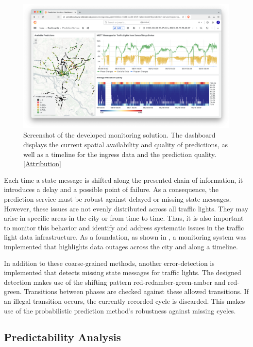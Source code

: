 \begin{figure}[t]
\centering
\includegraphics[width=\linewidth]{images/monitoring-screenshot.png}
\caption{Screenshot of the developed monitoring solution. The dashboard displays the current spatial availability and quality of predictions, as well as a timeline for the ingress data and the prediction quality. [\hyperref[attribution]{Attribution}]}
\label{fig:monitoring-screenshot}
\end{figure}

Each time a state message is shifted along the presented chain of information, it introduces a delay and a possible point of failure. As a consequence, the prediction service must be robust against delayed or missing state messages. However, these issues are not evenly distributed across all traffic lights. They may arise in specific areas in the city or from time to time. Thus, it is also important to monitor this behavior and identify and address systematic issues in the traffic light data infrastructure. As a foundation, as shown in , a monitoring system was implemented that highlights data outages across the city and along a timeline.

In addition to these coarse-grained methods, another error-detection is implemented that detects missing state messages for traffic lights. The designed detection makes use of the shifting pattern red-redamber-green-amber and red-green. Transitions between phases are checked against these allowed transitions. If an illegal transition occurs, the currently recorded cycle is discarded. This makes use of the probabilistic prediction method's robustness against missing cycles.

\subsection{Predictability Analysis}

